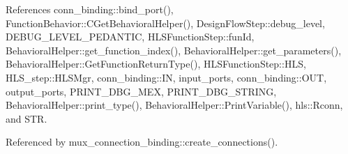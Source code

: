 References conn\+\_\+binding\+::bind\+\_\+port(), Function\+Behavior\+::\+C\+Get\+Behavioral\+Helper(), Design\+Flow\+Step\+::debug\+\_\+level, D\+E\+B\+U\+G\+\_\+\+L\+E\+V\+E\+L\+\_\+\+P\+E\+D\+A\+N\+T\+IC, H\+L\+S\+Function\+Step\+::fun\+Id, Behavioral\+Helper\+::get\+\_\+function\+\_\+index(), Behavioral\+Helper\+::get\+\_\+parameters(), Behavioral\+Helper\+::\+Get\+Function\+Return\+Type(), H\+L\+S\+Function\+Step\+::\+H\+LS, H\+L\+S\+\_\+step\+::\+H\+L\+S\+Mgr, conn\+\_\+binding\+::\+IN, input\+\_\+ports, conn\+\_\+binding\+::\+O\+UT, output\+\_\+ports, P\+R\+I\+N\+T\+\_\+\+D\+B\+G\+\_\+\+M\+EX, P\+R\+I\+N\+T\+\_\+\+D\+B\+G\+\_\+\+S\+T\+R\+I\+NG, Behavioral\+Helper\+::print\+\_\+type(), Behavioral\+Helper\+::\+Print\+Variable(), hls\+::\+Rconn, and S\+TR.



Referenced by mux\+\_\+connection\+\_\+binding\+::create\+\_\+connections().

